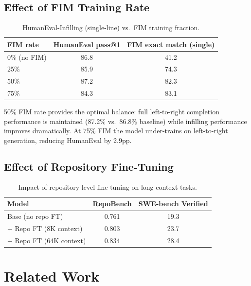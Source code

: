 \documentclass[11pt,a4paper]{article}
\begin{document}
\subsection{Effect of FIM Training Rate}

\begin{table}[H]
\centering
\caption{HumanEval-Infilling (single-line) vs.\ FIM training fraction.}
\label{tab:fim_ablation}
\begin{tabular}{lcc}
\toprule
\textbf{FIM rate} & \textbf{HumanEval pass@1} & \textbf{FIM exact match (single)} \\
\midrule
0\%  (no FIM)  & 86.8 & 41.2 \\
25\%           & 85.9 & 74.3 \\
50\%           & 87.2 & 82.3 \\
75\%           & 84.3 & 83.1 \\
\bottomrule
\end{tabular}
\end{table}

50\% FIM rate provides the optimal balance: full left-to-right completion performance is
maintained (87.2\% vs.\ 86.8\% baseline) while infilling performance improves dramatically.
At 75\% FIM the model under-trains on left-to-right generation, reducing HumanEval by 2.9pp.

\subsection{Effect of Repository Fine-Tuning}

\begin{table}[H]
\centering
\caption{Impact of repository-level fine-tuning on long-context tasks.}
\label{tab:repo_ablation}
\begin{tabular}{lcc}
\toprule
\textbf{Model} & \textbf{RepoBench} & \textbf{SWE-bench Verified} \\
\midrule
Base (no repo FT)         & 0.761 & 19.3 \\
$+$ Repo FT (8K context)  & 0.803 & 23.7 \\
$+$ Repo FT (64K context) & 0.834 & 28.4 \\
\bottomrule
\end{tabular}
\end{table}

\section{Related Work}
\end{document}
